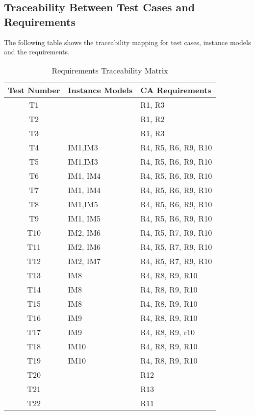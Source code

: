 \documentclass[12pt, titlepage]{article}
\begin{document}
\subsection{Traceability Between Test Cases and Requirements}

The following table shows the traceability mapping for test cases, instance models and the requirements. 

\begin{table} [H]
	\caption{Requirements Traceability Matrix}
	\label{Table:Table_Traceability}  
	\begin{tabular}{|c|p{5cm}|p{5cm}|}
		\hline	
		\textbf{Test Number} & \textbf{Instance Models} & \textbf{CA Requirements}\\
		\hline 
		T1&         & R1, R3       \\ \hline
		T2&         & R1, R2       \\ \hline
		T3&         & R1, R3       \\ \hline
		
		T4& IM1,IM3 & R4, R5, R6, R9, R10   \\ \hline
		T5& IM1,IM3& R4, R5, R6, R9, R10   \\ \hline
		
		T6& IM1, IM4& R4, R5, R6, R9, R10   \\ \hline
		T7& IM1, IM4& R4, R5, R6, R9, R10   \\ \hline
		
		T8& IM1,IM5& R4, R5, R6, R9, R10   \\ \hline
		T9& IM1, IM5& R4, R5, R6, R9, R10   \\ \hline
		
		
		T10& IM2, IM6& R4, R5, R7, R9, R10     \\ \hline
		T11& IM2, IM6& R4, R5, R7, R9, R10     \\ \hline
		
		
		T12& IM2, IM7& R4, R5, R7, R9, R10     \\ \hline
		
		
		T13& IM8     & R4, R8, R9, R10  \\ \hline
		T14& IM8     & R4, R8, R9, R10  \\ \hline
		T15& IM8     & R4, R8, R9, R10  \\ \hline
		
		
		T16& IM9     & R4, R8, R9, R10    \\ \hline
		T17& IM9     & R4, R8, R9, r10     \\ \hline
		
		T18& IM10    & R4, R8, R9, R10    \\ \hline
		T19& IM10    & R4, R8, R9, R10    \\ \hline
		
		T20&         & R12\\ \hline
		T21&         & R13\\ \hline
		T22&         & R11\\ \hline
		
	\end{tabular}\\
\end{table}
\end{document}
